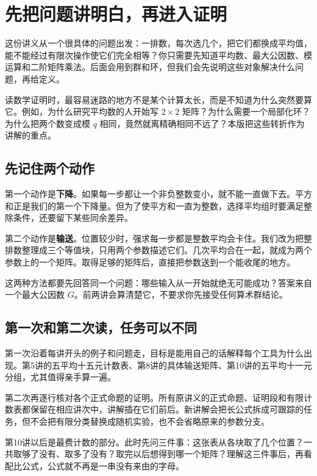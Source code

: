 \chapter*{先把问题讲明白，再进入证明}
这份讲义从一个很具体的问题出发：一排数，每次选几个，把它们都换成平均值，能不能经过有限次操作使它们完全相等？你只需要先知道平均数、最大公因数、模运算和二阶矩阵乘法。后面会用到群和环，但我们会先说明这些对象解决什么问题，再给定义。

读数学证明时，最容易迷路的地方不是某个计算太长，而是不知道为什么突然要算它。例如，为什么研究平均数的人开始写 $2\times2$ 矩阵？为什么需要一个局部化环？为什么把两个数变成模 $q$ 相同，竟然就离精确相同不远了？本版把这些转折作为讲解的重点。

\section*{先记住两个动作}
第一个动作是\textbf{下降}。如果每一步都让一个非负整数变小，就不能一直做下去。平方和正是我们的第一个下降量。但为了使平方和一直为整数，选择平均组时要满足整除条件，还要留下某些同余差异。

第二个动作是\textbf{输送}。位置较少时，强求每一步都是整数平均会卡住。我们改为把整排数整理成三个等值块，只用两个参数描述它们。几次平均合在一起，就成为两个参数上的一个矩阵。取得足够的矩阵后，直接把参数送到一个能收尾的地方。

这两种方法都要先回答同一个问题：哪些输入从一开始就绝无可能成功？答案来自一个最大公因数 $G$。前两讲会算清楚它，不要求你先接受任何算术群结论。

\section*{第一次和第二次读，任务可以不同}
第一次沿着每讲开头的例子和问题走，目标是能用自己的话解释每个工具为什么出现。第5讲的五平均十五元计数表、第8讲的具体输送矩阵、第10讲的五平均十一元分组，尤其值得亲手算一遍。

第二次再逐行核对各个正式命题的证明。所有原讲义的正式命题、证明段和有限计数表都保留在相应讲次中，讲解插在它们前后。新讲解会把长公式拆成可跟踪的任务，但不会把有限分类替换成随机实验，也不会省略原来的参数分支。

第10讲以后是最费计数的部分。此时先问三件事：这张表从各块取了几个位置？一共取够了没有、取多了没有？取完以后想得到哪一个矩阵？理解这三件事后，再看配比公式，公式就不再是一串没有来由的字母。

